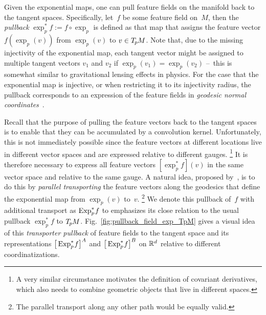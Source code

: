 Given the exponential maps, one can pull feature fields on the manifold back to the tangent spaces.
Specifically, let~$f$ be some feature field on~$M$, then the \emph{pullback} $\exp_p^*f := f \circ \exp_p$ is defined as that map that assigns the feature vector $f(\exp_p(v))$ from $\exp_p(v)$ to $v\in T_{\mkern-1.5mu p}\mkern-.5muM$.
Note that, due to the missing injectivity of the exponential map, each tangent vector might be assigned to multiple tangent vectors $v_1$ and $v_2$ if $\exp_p(v_1) = \exp_p(v_2)$ \:--\, this is somewhat similar to gravitational lensing effects in physics.
For the case that the exponential map is injective, or when restricting it to its injectivity radius, the pullback corresponds to an expression of the feature fields in \emph{geodesic normal coordinates}~\cite{masci2015geodesic}.


Recall that the purpose of pulling the feature vectors back to the tangent spaces is to enable that they can be accumulated by a convolution kernel.
Unfortunately, this is not immediately possible since the feature vectors at different locations live in different vector spaces and are expressed relative to different gauges.%
\footnote{
    A very similar circumstance motivates the definition of covariant derivatives, which also needs to combine geometric objects that live in different spaces.
}
It is therefore necessary to express all feature vectors $[\exp_p^*f](v)$ in the same vector space and relative to the same gauge.
A natural idea, proposed by~\citet{poulenard2018multi}, is to do this by \emph{parallel transporting} the feature vectors along the geodesics that define the exponential map from $\exp_p(v)$ to~$v$.%
\footnote{
    The parallel transport along any other path would be equally valid.
}
We denote this pullback of~$f$ with additional transport as $\operatorname{Exp}^*_p\mkern-2mu f$ to emphasizes its close relation to the usual pullback $\exp_p^*f$ to $T_{\mkern-1.5mu p}\mkern-.5muM$.
Fig.~\ref{fig:pullback_field_exp_TpM} gives a visual idea of this \emph{transporter pullback} of feature fields to the tangent space and its representations $\big[\operatorname{Exp}^*_p\mkern-2mu f\big]^A$ and $\big[\operatorname{Exp}^*_p\mkern-2mu f\big]^B$ on $\mathbb{R}^d$ relative to different coordinatizations.


